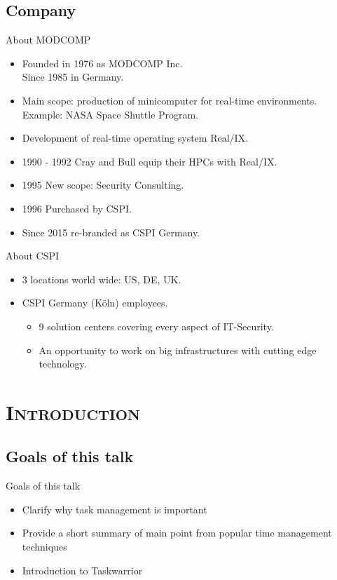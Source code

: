 \documentclass[xcolor=x11names,compress]{beamer}
\renewcommand{\(}{\begin{columns}}
\renewcommand{\)}{\end{columns}}
\newcommand{\<}[1]{\begin{column}{#1}}
\renewcommand{\>}{\end{column}}
\begin{document}
\subsection*{Company}

\begin{frame}{About MODCOMP}
	\begin{itemize}
		\item Founded in 1976 as MODCOMP Inc.\\ Since 1985 in Germany.
		\item Main scope: production of minicomputer for real-time environments.\\ Example: NASA Space Shuttle Program.
		\item Development of real-time operating system Real/IX.
		\item 1990 - 1992 Cray and Bull equip their HPCs with Real/IX.
		\item 1995 New scope: Security Consulting.
		\item 1996 Purchased by CSPI.
		\item Since 2015 re-branded as CSPI Germany.
	\end{itemize}
\end{frame}

\begin{frame}{About CSPI}
	\begin{itemize}
		\item 3 locations world wide: US, DE, UK.
		\item CSPI Germany (Köln)  employees.
		\begin{itemize}
			\item 9 solution centers covering every aspect of IT-Security.
			\item An opportunity to work on big infrastructures with cutting edge technology.
		\end{itemize}
	\end{itemize}
\end{frame}

\section{\scshape{Introduction}}

\subsection{Goals of this talk}

\begin{frame}{Goals of this talk}
\pause
	\begin{itemize}[<+-| alert@+>]
			\setlength\itemsep{2em}
			\item Clarify why task management is important
			\item Provide a short summary of main point from popular time management techniques
			\item Introduction to Taskwarrior
	\end{itemize}
\end{frame}
\end{document}
